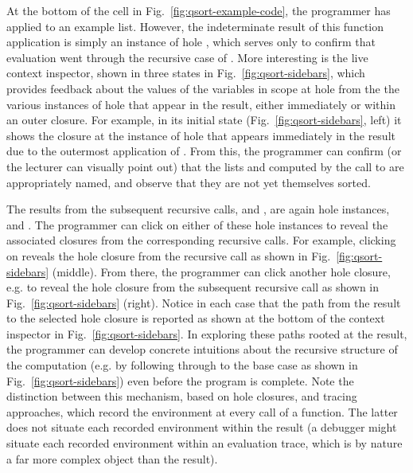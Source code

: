 At the bottom of the cell in Fig.~\ref{fig:qsort-example-code}, the programmer has applied  to an example list. However, 
the indeterminate result of this function application is simply an instance of hole , which serves only to confirm that evaluation went through the recursive case of . 
More interesting is the live context inspector, shown in three states in Fig.~\ref{fig:qsort-sidebars}, which provides feedback about the values of the variables in scope at hole  from the the various instances of hole  that appear in the result, either immediately or within an outer closure. For example, in its initial state (Fig.~\ref{fig:qsort-sidebars}, left) it shows the closure at the instance of hole  that appears immediately in the result due to the outermost application of . From this, the programmer can confirm (or the lecturer can visually point out) that 
the lists  and  computed by the call to  are appropriately named, and observe that they are not yet themselves sorted.

The results from the subsequent recursive calls,  and , are again hole instances,  and . 
The programmer can click on either of these hole instances to reveal the associated closures from the corresponding recursive calls. 
For example, clicking on  reveals the hole closure from the  recursive call as shown in Fig.~\ref{fig:qsort-sidebars} (middle). 
From there, the programmer can click another hole closure, e.g.  to reveal the hole closure from the subsequent  recursive call as shown in Fig.~\ref{fig:qsort-sidebars} (right). 
Notice in each case that the path from the result to the selected hole closure is reported as shown at the bottom of the context inspector in Fig.~\ref{fig:qsort-sidebars}. 
In exploring these paths rooted at the result, the programmer can develop concrete intuitions about the recursive structure of the computation (e.g. by following through to the base case as shown in Fig.~\ref{fig:qsort-sidebars}) even before the program is complete. 
Note the distinction between this mechanism, based on hole closures, and tracing approaches, which record the environment at every call of a function. The latter does not situate each 
recorded environment within the result (a debugger might situate each recorded environment within an evaluation trace, which is by nature a far more complex object than the result). 

